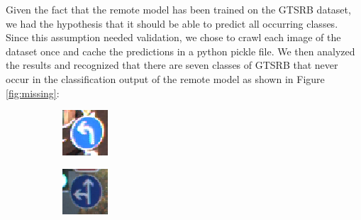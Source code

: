 Given the fact that the remote model has been trained on the GTSRB dataset, we had the hypothesis that it should be able to predict all occurring classes.
Since this assumption needed validation, we chose to crawl each image of the dataset once and cache the predictions in a python pickle file.
We then analyzed the results and recognized that there are seven classes of GTSRB that never occur in the classification output of the remote model as shown in Figure \ref{fig:missing}:

\begin{figure}
\begin{subfigure}{.19\linewidth}
\includegraphics[width=0.7\linewidth]{imgs/missing/00000_00012}
\end{subfigure}
\begin{subfigure}{.19\linewidth}
\includegraphics[width=0.7\linewidth]{imgs/missing/00001_00016}

\end{subfigure}
\end{figure}
